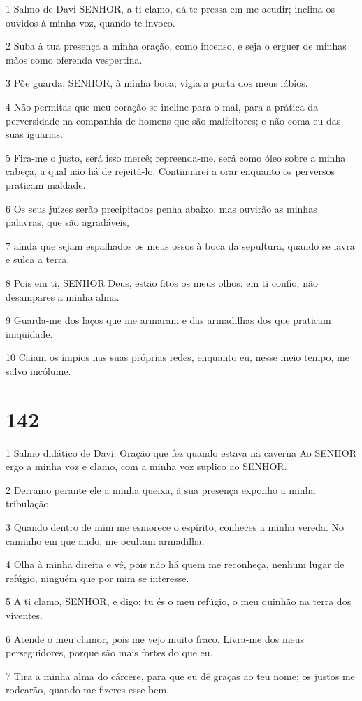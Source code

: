 \par 1 Salmo de Davi SENHOR, a ti clamo, dá-te pressa em me acudir; inclina os ouvidos à minha voz, quando te invoco.
\par 2 Suba à tua presença a minha oração, como incenso, e seja o erguer de minhas mãos como oferenda vespertina.
\par 3 Põe guarda, SENHOR, à minha boca; vigia a porta dos meus lábios.
\par 4 Não permitas que meu coração se incline para o mal, para a prática da perversidade na companhia de homens que são malfeitores; e não coma eu das suas iguarias.
\par 5 Fira-me o justo, será isso mercê; repreenda-me, será como óleo sobre a minha cabeça, a qual não há de rejeitá-lo. Continuarei a orar enquanto os perversos praticam maldade.
\par 6 Os seus juízes serão precipitados penha abaixo, mas ouvirão as minhas palavras, que são agradáveis,
\par 7 ainda que sejam espalhados os meus ossos à boca da sepultura, quando se lavra e sulca a terra.
\par 8 Pois em ti, SENHOR Deus, estão fitos os meus olhos: em ti confio; não desampares a minha alma.
\par 9 Guarda-me dos laços que me armaram e das armadilhas dos que praticam iniqüidade.
\par 10 Caiam os ímpios nas suas próprias redes, enquanto eu, nesse meio tempo, me salvo incólume.

\chapter{142}

\par 1 Salmo didático de Davi. Oração que fez quando estava na caverna Ao SENHOR ergo a minha voz e clamo, com a minha voz suplico ao SENHOR.
\par 2 Derramo perante ele a minha queixa, à sua presença exponho a minha tribulação.
\par 3 Quando dentro de mim me esmorece o espírito, conheces a minha vereda. No caminho em que ando, me ocultam armadilha.
\par 4 Olha à minha direita e vê, pois não há quem me reconheça, nenhum lugar de refúgio, ninguém que por mim se interesse.
\par 5 A ti clamo, SENHOR, e digo: tu és o meu refúgio, o meu quinhão na terra dos viventes.
\par 6 Atende o meu clamor, pois me vejo muito fraco. Livra-me dos meus perseguidores, porque são mais fortes do que eu.
\par 7 Tira a minha alma do cárcere, para que eu dê graças ao teu nome; os justos me rodearão, quando me fizeres esse bem.

